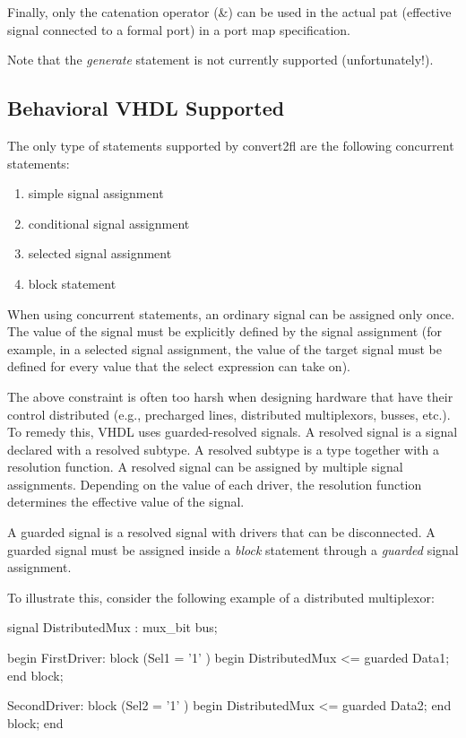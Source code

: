 Finally, only the catenation operator (\&) can be used in the actual pat
(effective signal connected to a formal port) in a port map specification.

Note that the {\em generate} statement is not currently supported
(unfortunately!).

\subsection{Behavioral VHDL Supported}

The only type of statements supported by convert2fl are the following
concurrent statements:
\begin{enumerate}
\item
simple signal assignment
\item
conditional signal assignment
\item
selected signal assignment
\item
block statement
\end{enumerate}

When using concurrent statements, an ordinary signal can be assigned only once.
The value of the signal must be explicitly defined by the signal assignment
(for example, in a selected signal assignment, the value
of the target signal must be defined for every value that the select
expression can take on).

The above constraint is often too harsh when designing hardware
that have their control distributed (e.g., precharged lines, distributed
multiplexors, busses, etc.).
To remedy this, VHDL uses guarded-resolved signals.
A resolved signal is a signal declared with a resolved subtype.
A resolved subtype is a type together with a resolution function.
A resolved signal can be assigned by multiple signal assignments.
Depending on the value of each driver, the resolution function determines
the effective value of the signal.

A guarded signal is a resolved signal with drivers that can be disconnected.
A guarded signal must be assigned inside a {\em block} statement
through a {\em guarded} signal assignment.

To illustrate this, consider the following example of a distributed multiplexor:
\begin{hol}
signal DistributedMux : mux\_bit bus;

begin
    FirstDriver: block (Sel1 = '1' )
    begin
        DistributedMux <= guarded Data1;
    end block;

    SecondDriver: block (Sel2 = '1' )
    begin
        DistributedMux <= guarded Data2;
    end block;
end
\end{hol}

